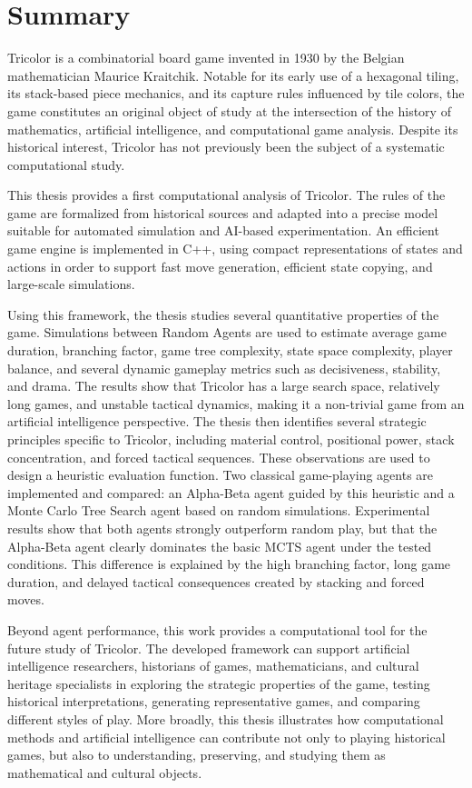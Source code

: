 \chapter*{Summary}

Tricolor is a combinatorial board game invented in 1930 by the Belgian mathematician Maurice Kraitchik. Notable for its early use of a hexagonal tiling, its stack-based piece mechanics, and its capture rules influenced by tile colors, the game constitutes an original object of study at the intersection of the history of mathematics, artificial intelligence, and computational game analysis. Despite its historical interest, Tricolor has not previously been the subject of a systematic computational study.

This thesis provides a first computational analysis of Tricolor. The rules of the game are formalized from historical sources and adapted into a precise model suitable for automated simulation and AI-based experimentation. An efficient game engine is implemented in C++, using compact representations of states and actions in order to support fast move generation, efficient state copying, and large-scale simulations.

Using this framework, the thesis studies several quantitative properties of the game. Simulations between Random Agents are used to estimate average game duration, branching factor, game tree complexity, state space complexity, player balance, and several dynamic gameplay metrics such as decisiveness, stability, and drama. The results show that Tricolor has a large search space, relatively long games, and unstable tactical dynamics, making it a non-trivial game from an artificial intelligence perspective.
The thesis then identifies several strategic principles specific to Tricolor, including material control, positional power, stack concentration, and forced tactical sequences. These observations are used to design a heuristic evaluation function. Two classical game-playing agents are implemented and compared: an Alpha-Beta agent guided by this heuristic and a Monte Carlo Tree Search agent based on random simulations. Experimental results show that both agents strongly outperform random play, but that the Alpha-Beta agent clearly dominates the basic MCTS agent under the tested conditions. This difference is explained by the high branching factor, long game duration, and delayed tactical consequences created by stacking and forced moves.

Beyond agent performance, this work provides a computational tool for the future study of Tricolor. The developed framework can support artificial intelligence researchers, historians of games, mathematicians, and cultural heritage specialists in exploring the strategic properties of the game, testing historical interpretations, generating representative games, and comparing different styles of play. More broadly, this thesis illustrates how computational methods and artificial intelligence can contribute not only to playing historical games, but also to understanding, preserving, and studying them as mathematical and cultural objects.
